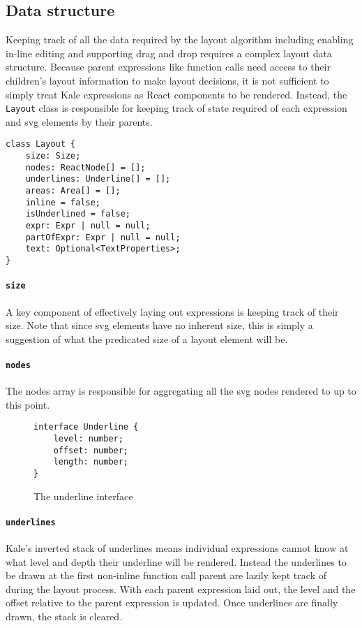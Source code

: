 \subsection{Data structure}

Keeping track of all the data required by the layout algorithm
including enabling in-line editing and supporting drag and drop requires a
complex layout data structure.
Because parent expressions like function calls need access to their children's
layout information to make layout decisions, it is not sufficient to simply
treat Kale expressions as React components to be rendered. Instead, the
\texttt{Layout} class is responsible for keeping track of state required
of each expression and \ac{svg} elements by their parents.

\begin{Verbatim}[samepage, frame=lines]
class Layout {
    size: Size;
    nodes: ReactNode[] = [];
    underlines: Underline[] = [];
    areas: Area[] = [];
    inline = false;
    isUnderlined = false;
    expr: Expr | null = null;
    partOfExpr: Expr | null = null;
    text: Optional<TextProperties>;
}
\end{Verbatim}

\newcommand{\field}[1]{
	\paragraph{\texttt{#1}}
	\label{layout:#1}
}
\field{size} A key component of effectively laying out expressions is
keeping track of their size. Note that since \ac{svg} elements have no
inherent size, this is simply a suggestion of what the predicated size
of a layout element will be.

\field{nodes} The nodes array is responsible for aggregating all the
\ac{svg} nodes rendered to up to this point.

\setlength{\columnsep}{5ex}
\begin{wrapfigure}[7]{R}{30ex}
\vspace*{-\baselineskip}
\begin{Verbatim}[samepage]
interface Underline {
    level: number;
    offset: number;
    length: number;
}
\end{Verbatim}
\caption{The underline interface}
\end{wrapfigure}
\field{underlines} Kale's inverted stack of underlines means individual
expressions cannot know at what level and depth their underline will
be rendered. Instead the underlines to be drawn at the first non-inline
function call parent are lazily kept track of during the layout process. With
each parent expression laid
out, the level and the offset relative to the parent expression is updated.
Once underlines are finally drawn, the stack is cleared.

